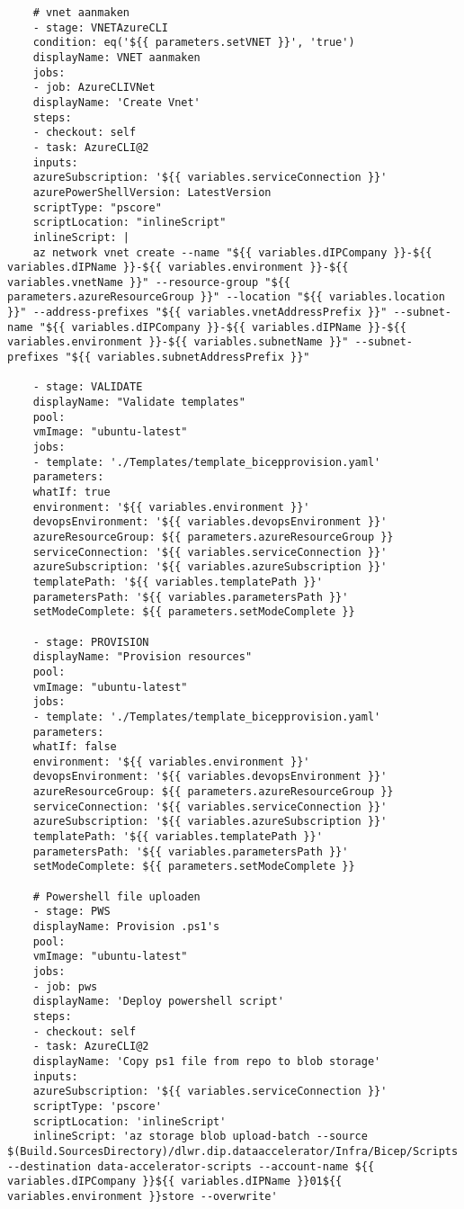 \documentclass[dutch,dit,thesis]{hogentreport}
\begin{document}
\begin{lstlisting}
    # vnet aanmaken
    - stage: VNETAzureCLI
    condition: eq('${{ parameters.setVNET }}', 'true')
    displayName: VNET aanmaken
    jobs:
    - job: AzureCLIVNet
    displayName: 'Create Vnet'
    steps:
    - checkout: self
    - task: AzureCLI@2
    inputs:
    azureSubscription: '${{ variables.serviceConnection }}'
    azurePowerShellVersion: LatestVersion
    scriptType: "pscore"
    scriptLocation: "inlineScript"
    inlineScript: |
    az network vnet create --name "${{ variables.dIPCompany }}-${{ variables.dIPName }}-${{ variables.environment }}-${{ variables.vnetName }}" --resource-group "${{ parameters.azureResourceGroup }}" --location "${{ variables.location }}" --address-prefixes "${{ variables.vnetAddressPrefix }}" --subnet-name "${{ variables.dIPCompany }}-${{ variables.dIPName }}-${{ variables.environment }}-${{ variables.subnetName }}" --subnet-prefixes "${{ variables.subnetAddressPrefix }}"

    - stage: VALIDATE
    displayName: "Validate templates"
    pool:
    vmImage: "ubuntu-latest"
    jobs:
    - template: './Templates/template_bicepprovision.yaml'
    parameters:
    whatIf: true
    environment: '${{ variables.environment }}'
    devopsEnvironment: '${{ variables.devopsEnvironment }}'
    azureResourceGroup: ${{ parameters.azureResourceGroup }}
    serviceConnection: '${{ variables.serviceConnection }}'
    azureSubscription: '${{ variables.azureSubscription }}'
    templatePath: '${{ variables.templatePath }}'
    parametersPath: '${{ variables.parametersPath }}'
    setModeComplete: ${{ parameters.setModeComplete }}

    - stage: PROVISION
    displayName: "Provision resources"
    pool:
    vmImage: "ubuntu-latest"
    jobs:
    - template: './Templates/template_bicepprovision.yaml'
    parameters:
    whatIf: false
    environment: '${{ variables.environment }}'
    devopsEnvironment: '${{ variables.devopsEnvironment }}'
    azureResourceGroup: ${{ parameters.azureResourceGroup }}
    serviceConnection: '${{ variables.serviceConnection }}'
    azureSubscription: '${{ variables.azureSubscription }}'
    templatePath: '${{ variables.templatePath }}'
    parametersPath: '${{ variables.parametersPath }}'
    setModeComplete: ${{ parameters.setModeComplete }}

    # Powershell file uploaden
    - stage: PWS
    displayName: Provision .ps1's
    pool:
    vmImage: "ubuntu-latest"
    jobs:
    - job: pws
    displayName: 'Deploy powershell script'
    steps:
    - checkout: self
    - task: AzureCLI@2
    displayName: 'Copy ps1 file from repo to blob storage'
    inputs:
    azureSubscription: '${{ variables.serviceConnection }}'
    scriptType: 'pscore'
    scriptLocation: 'inlineScript'
    inlineScript: 'az storage blob upload-batch --source $(Build.SourcesDirectory)/dlwr.dip.dataaccelerator/Infra/Bicep/Scripts --destination data-accelerator-scripts --account-name ${{ variables.dIPCompany }}${{ variables.dIPName }}01${{ variables.environment }}store --overwrite'


\end{lstlisting}
\end{document}
